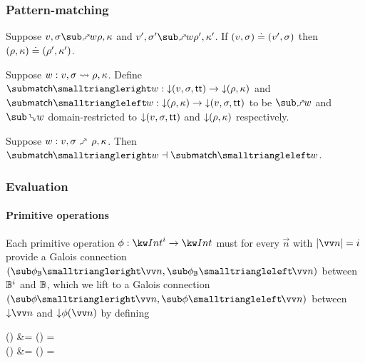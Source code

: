 \subsubsection{Pattern-matching}




\begin{lemma}
   Suppose $v, \sigma \matchFwdR{w} \rho, \kappa$ and $v', \sigma' \matchFwdR{w} \rho', \kappa'$. If $(v, \sigma) \doteq (v', \sigma)$ then $(\rho, \kappa) \doteq (\rho', \kappa')$.
\end{lemma}

\begin{definition}
   Suppose $w: v, \sigma \rightsquigarrow \rho, \kappa$. Define $\matchFwdF{w}: \Below{(v,\sigma,\TT)} \to \Below{(\rho,\kappa)}$ and $\matchBwdF{w}: \Below{(\rho,\kappa)} \to \Below{(v,\sigma,\TT)}$ to be $\matchFwdR{w}$ and $\matchBwdR{w}$ domain-restricted to ${\downarrow}{(v,\sigma,\mathsf{tt})}$ and ${\downarrow}{(\rho,\kappa)}$ respectively.
\end{definition}

\begin{theorem}
\label{thm:core-language:match:gc}
   Suppose $w: v, \sigma \matchFwdS \rho, \kappa$.  Then $\matchFwdF{w} \adjoint \matchBwdF{w}$.
\end{theorem}

\subsubsection{Evaluation}

\paragraph{Primitive operations}

Each primitive operation $\phi: \tyInt^{i} \to \tyInt$ must for every $\vec{n}$ with $\length{\vec{n}} = i$ provide a Galois connection $(\primFwdBool{\phi}{\vec{n}}, \primBwdBool{\phi}{\vec{n}})$ between $\mathbb{B}^i$ and $\mathbb{B}$, which we lift to a Galois connection $(\primFwd{\phi}{\vec{n}}, \primBwd{\phi}{\vec{n}})$ between $\Below{\vec{n}}$ and $\Below{\phi(\vec{n})}$ by defining
\begin{definition}
\label{def:core-language:primop-gc}
\begin{salign}
   () &= 
   (\vec{\alpha}) = \beta
   \\
   () &= 
   (\beta) = \vec{\alpha}
\end{salign}
\end{definition}

